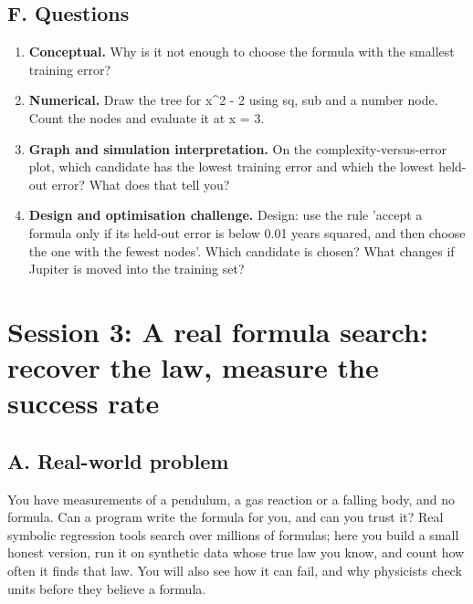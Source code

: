 \documentclass[11pt,a4paper]{article}
\begin{document}
\subsection*{F. Questions}
\begin{enumerate}[nosep]
\item \textbf{Conceptual.} Why is it not enough to choose the formula with the smallest training error?
\item \textbf{Numerical.} Draw the tree for x\textasciicircum{}2 - 2 using sq, sub and a number node. Count the nodes and evaluate it at x = 3.
\item \textbf{Graph and simulation interpretation.} On the complexity-versus-error plot, which candidate has the lowest training error and which the lowest held-out error? What does that tell you?
\item \textbf{Design and optimisation challenge.} Design: use the rule 'accept a formula only if its held-out error is below 0.01 years squared, and then choose the one with the fewest nodes'. Which candidate is chosen? What changes if Jupiter is moved into the training set?
\end{enumerate}

\section{Session 3: A real formula search: recover the law, measure the success rate}

\subsection*{A. Real-world problem}
You have measurements of a pendulum, a gas reaction or a falling body, and no formula. Can a program write the formula for you, and can you trust it? Real symbolic regression tools search over millions of formulas; here you build a small honest version, run it on synthetic data whose true law you know, and count how often it finds that law. You will also see how it can fail, and why physicists check units before they believe a formula.
\end{document}
